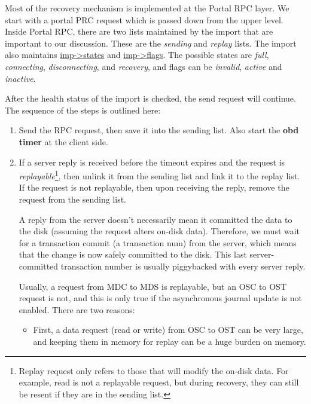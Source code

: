 Most of the recovery mechanism is implemented at the Portal RPC layer.  We
start with a portal PRC request which is passed down from the upper level.
Inside Portal RPC, there are two lists maintained by the import that are
important to our discussion. These are the \textit{sending} and \textit{replay}
lists. The import also maintains \url{imp->states} and \url{imp->flags}. The
possible states are \textit{full}, \textit{connecting}, \textit{disconnecting},
and \textit{recovery}, and flags can be \textit{invalid}, \textit{active} and
\textit{inactive}. 

After the health status of the import is checked, the send request will
continue. The sequence of the steps is outlined here:

\begin{enumerate}

\item Send the RPC request, then save it into the sending list. Also start
the \textbf{obd timer} at the client side.

\item If a server reply is received before the timeout expires and the request is
\textit{replayable}\footnote{Replay request only refers to those that will
modify the on-disk data. For example, read is not a replayable request, but
during recovery, they can still be resent if they are in the sending list.},
then unlink it from the sending list and link it to the replay list. If the
request is not replayable, then upon receiving the reply, remove the request
from the sending list.

A reply from the server doesn't necessarily mean it committed the data to the
disk (assuming the request alters on-disk data).  Therefore, we must wait for a
transaction commit (a transaction num) from the server, which means that the
change is now safely committed to the disk.  This last server-committed
transaction number is usually piggybacked with every server reply.  

Usually, a request from MDC to MDS is replayable, but an OSC to OST request is
not, and this is only true if the asynchronous journal update is not enabled.
There are two reasons:

  \begin{itemize}
  
  \item First, a data request (read or write) from OSC to OST can be very
  large, and keeping them in memory for replay can be a huge burden
  on memory.


\end{itemize}
\end{enumerate}
